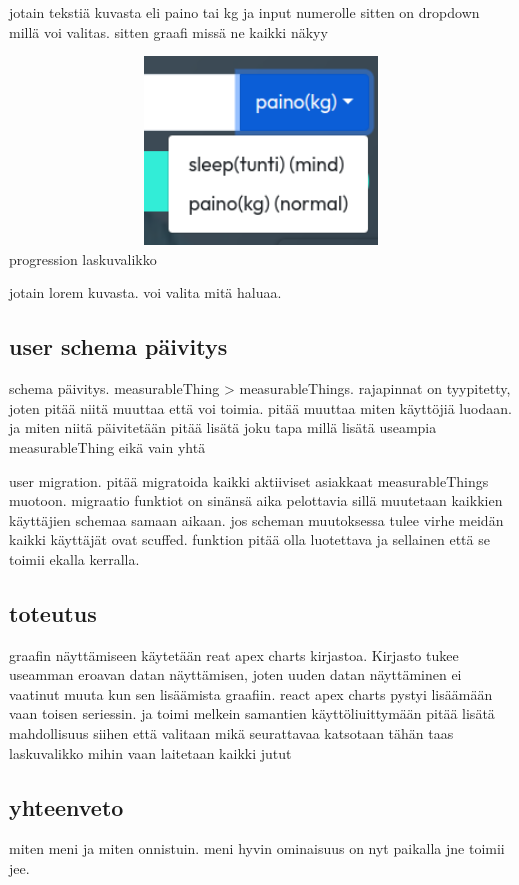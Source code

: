 jotain tekstiä kuvasta 
eli paino tai kg ja input numerolle sitten on dropdown millä voi valitas.
sitten graafi missä ne kaikki näkyy
\medskip


\includegraphics[width= 15cm, height=5cm]{src/public/progressselect.png} \\
progression laskuvalikko
\medskip


jotain lorem kuvasta.
voi valita mitä haluaa.
\medskip



\subsection*{user schema päivitys}

schema päivitys. measurableThing > measurableThings.  
rajapinnat on tyypitetty, joten pitää niitä muuttaa että voi toimia.
%
pitää muuttaa miten käyttöjiä luodaan. ja miten niitä päivitetään
pitää lisätä joku tapa millä lisätä useampia measurableThing eikä vain yhtä
\medskip

user migration. pitää migratoida kaikki aktiiviset asiakkaat measurableThings muotoon.
migraatio funktiot on sinänsä aika pelottavia sillä muutetaan kaikkien käyttäjien schemaa samaan aikaan. jos scheman muutoksessa tulee virhe meidän kaikki käyttäjät ovat scuffed.
funktion pitää olla luotettava ja sellainen että se toimii ekalla kerralla.
\medskip

\subsection*{toteutus}
graafin näyttämiseen käytetään reat apex charts kirjastoa. Kirjasto tukee useamman eroavan datan näyttämisen, joten uuden datan näyttäminen ei vaatinut muuta kun sen lisäämista graafiin.
react apex charts pystyi lisäämään vaan toisen seriessin. ja toimi melkein samantien
käyttöliuittymään pitää lisätä mahdollisuus siihen että valitaan mikä seurattavaa katsotaan
tähän taas laskuvalikko mihin vaan laitetaan kaikki jutut




\subsection*{yhteenveto}
miten meni ja miten onnistuin.
meni hyvin ominaisuus on nyt paikalla jne toimii jee.





